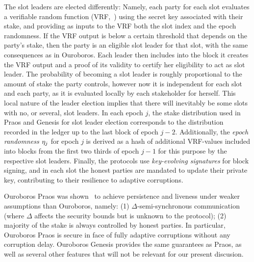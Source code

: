 The slot leaders are elected differently: Namely, each party for each
slot evaluates a verifiable random function (VRF,~\cite{vrf}) using
the secret key associated with their stake, and providing as inputs to the VRF
both the slot index and the epoch randomness. If the VRF output is below a
certain threshold that depends on the party's stake, then the party is an
eligible slot leader  for that slot, with the same consequences as in Ouroboros.
Each leader then includes into the block it creates the VRF output and a
proof of its validity to certify her eligibility to act as slot leader.
%
The probability of becoming a slot leader is roughly proportional to the amount of
stake the party controls, however now it is independent for each slot and each
party, as it is evaluated locally by each stakeholder for herself.  This local
nature of the leader election implies that there will inevitably be some slots
with no, or several, slot leaders.
%
In each epoch $j$, the stake distribution used in Praos and Genesis
for slot leader
election corresponds to the distribution recorded in the ledger up to the last
block of epoch $j-2$.  Additionally, the \emph{epoch randomness $\eta_j$} for epoch $j$
is derived as a hash of additional VRF-values included into blocks
from the first two thirds of epoch $j-1$ for this purpose by the respective slot
leaders.
%
Finally, the protocols use \emph{key-evolving signatures} for
block signing, and in each slot the honest parties are mandated to update their
private key, contributing to their resilience to adaptive corruptions.

Ouroboros Praos was shown~\cite{praos} to achieve
persistence and liveness under weaker assumptions than Ouroboros,
namely:
    (1) $\Delta$-semi-synchronous communication
    (where $\Delta$ affects the security bounds
    but is unknown to the protocol);
    (2) majority of the stake is always controlled by honest parties.
In particular, Ouroboros Praos is secure in face of fully adaptive corruptions
without any corruption  delay.
Ouroboros Genesis provides the same guarantees as Praos, as well as several
other features that will not be relevant for our present
discusion.

